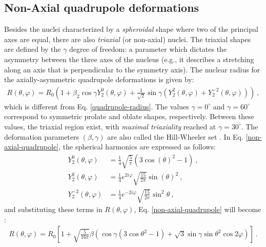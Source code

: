 \subsection{Non-Axial quadrupole deformations}

Besides the nuclei characterized by a \emph{spheroidal} shape where two of the principal axes are equal, there are also \emph{triaxial} (or non-axial) nuclei. The triaxial shapes are defined by the $\gamma$ degree of freedom: a parameter which dictates the asymmetry between the three axes of the nucleus (e.g., it describes a stretching along an axis that is perpendicular to the symmetry axis). The nuclear radius for the axially-asymmetric quadrupole deformations is given by:
\begin{align}
    R(\theta,\varphi)=R_0\left(1+\beta_2\cos\gamma Y_2^0(\theta,\varphi)+\frac{1}{\sqrt{2}}\sin\gamma(Y_2^2(\theta,\varphi)+Y_2^{-2}(\theta,\varphi))\right)\ ,
    \label{non-axial-quadrupole}
\end{align}
which is different from Eq. \ref{quadrupole-radius}. The values $\gamma=0^\circ$ and $\gamma=60^\circ$ correspond to symmetric prolate and oblate shapes, respectively. Between these values, the triaxial region exist, with \emph{maximal triaxiality} reached at $\gamma=30^\circ$. The deformation parameters $(\beta,\gamma)$ are also called the Hill-Wheeler set \cite{wong2008introductory}. In Eq. \ref{non-axial-quadrupole}, the spherical harmonics are expressed as follows:
\begin{align}
    Y_2^0(\theta,\varphi)&=\frac{1}{4}\sqrt{\frac{5}{\pi}}\left(3\cos(\theta)^2-1\right)\ , \nonumber\\
    Y_2^2(\theta,\varphi)&=\frac{1}{4}e^{2i\varphi}\sqrt{\frac{15}{2\pi}}\sin(\theta)^2\ ,\nonumber\\
    Y_2^{-2}(\theta,\varphi)&=\frac{1}{4}e^{-2i\varphi}\sqrt{\frac{15}{2\pi}}\sin^2\theta\ ,
\end{align}
and substituting these terms in $R(\theta,\varphi)$, Eq. \ref{non-axial-quadrupole} will become \cite{andersson1976nuclear,bohr1998nuclear}:
\begin{align}
    R(\theta,\varphi)=R_0\left[1+\sqrt{\frac{5}{16\pi}}\beta\left(\cos\gamma(3\cos\theta^2-1)+\sqrt{3}\sin\gamma\sin\theta^2\cos2\varphi\right)\right]\ .
\end{align}

